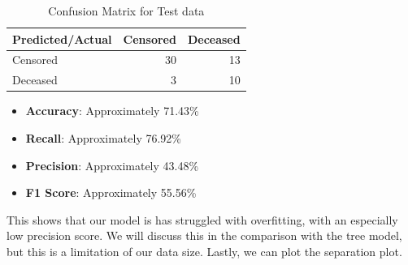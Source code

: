 \documentclass[
]{article}
\newenvironment{Shaded}{\begin{snugshade}}{\end{snugshade}}
\newcommand{\AttributeTok}[1]{\textcolor[rgb]{0.13,0.29,0.53}{#1}}
\newcommand{\CommentTok}[1]{\textcolor[rgb]{0.56,0.35,0.01}{\textit{#1}}}
\newcommand{\DecValTok}[1]{\textcolor[rgb]{0.00,0.00,0.81}{#1}}
\newcommand{\FunctionTok}[1]{\textcolor[rgb]{0.13,0.29,0.53}{\textbf{#1}}}
\newcommand{\NormalTok}[1]{#1}
\newcommand{\OtherTok}[1]{\textcolor[rgb]{0.56,0.35,0.01}{#1}}
\newcommand{\SpecialCharTok}[1]{\textcolor[rgb]{0.81,0.36,0.00}{\textbf{#1}}}
\newcommand{\StringTok}[1]{\textcolor[rgb]{0.31,0.60,0.02}{#1}}
\begin{document}
\begin{Shaded}
\end{Shaded}

\begin{table}

\caption{\label{tab:unnamed-chunk-48}Confusion Matrix for Test data}
\centering
\begin{tabular}[t]{l|r|r}
\hline
Predicted/Actual & Censored & Deceased\\
\hline
Censored & 30 & 13\\
\hline
Deceased & 3 & 10\\
\hline
\end{tabular}
\end{table}

\begin{itemize}
\item
  \textbf{Accuracy}: Approximately 71.43\%
\item
  \textbf{Recall}: Approximately 76.92\%
\item
  \textbf{Precision}: Approximately 43.48\%
\item
  \textbf{F1 Score}: Approximately 55.56\%
\end{itemize}

This shows that our model is has struggled with overfitting, with an
especially low precision score. We will discuss this in the comparison
with the tree model, but this is a limitation of our data size. Lastly,
we can plot the separation plot.
\end{document}
